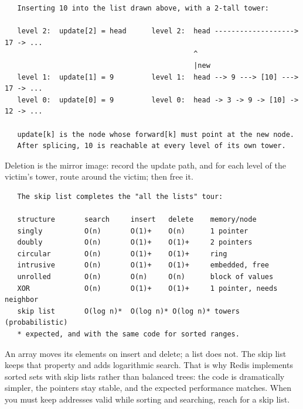 \begin{verbatim}
   Inserting 10 into the list drawn above, with a 2-tall tower:

   level 2:  update[2] = head      level 2:  head -------------------> 17 -> ...
                                             ^
                                             |new
   level 1:  update[1] = 9         level 1:  head --> 9 ---> [10] ---> 17 -> ...
   level 0:  update[0] = 9         level 0:  head -> 3 -> 9 -> [10] -> 12 -> ...

   update[k] is the node whose forward[k] must point at the new node.
   After splicing, 10 is reachable at every level of its own tower.
\end{verbatim}

Deletion is the mirror image: record the update path, and for each
level of the victim's tower, route  around
the victim; then free it.

\begin{verbatim}
   The skip list completes the "all the lists" tour:

   structure       search     insert   delete    memory/node
   singly          O(n)       O(1)+    O(n)      1 pointer
   doubly          O(n)       O(1)+    O(1)+     2 pointers
   circular        O(n)       O(1)+    O(1)+     ring
   intrusive       O(n)       O(1)+    O(1)+     embedded, free
   unrolled        O(n)       O(n)     O(n)      block of values
   XOR             O(n)       O(1)+    O(1)+     1 pointer, needs neighbor
   skip list       O(log n)*  O(log n)* O(log n)* towers (probabilistic)
   * expected, and with the same code for sorted ranges.
\end{verbatim}

\begin{insight}
An array moves its elements on insert and delete; a list does not. The
skip list keeps that property and adds logarithmic search. That is why
Redis implements sorted sets with skip lists rather than balanced
trees: the code is dramatically simpler, the pointers stay stable, and
the expected performance matches. When you must keep addresses valid
while sorting and searching, reach for a skip list.
\end{insight}

